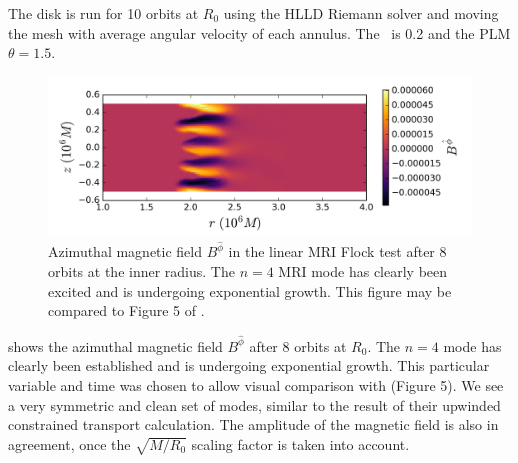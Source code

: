 The disk is run for 10 orbits at $R_0$ using the HLLD Riemann solver and moving the mesh with average angular velocity of each annulus.  The \CFL\ is 0.2 and the PLM $\theta=1.5$.

\begin{figure}
\begin{center}
	\includegraphics[width=\textwidth]{figures/numerics/flock_Bp.png}
\end{center}
\caption{Azimuthal magnetic field $B^{\hat{\phi}}$ in the linear MRI Flock test after 8 orbits at the inner radius.  The $n=4$ MRI mode has clearly been excited and is undergoing exponential growth.  This figure may be compared to Figure 5 of \citet{Flock10}. }
\end{figure}

 shows the azimuthal magnetic field $B^{\hat{\phi}}$ after 8 orbits at $R_0$.  The $n=4$ mode has clearly been established and is undergoing exponential growth.  This particular variable and time was chosen to allow visual comparison with \citet{Flock10} (Figure 5).  We see a very symmetric and clean set of modes, similar to the result of their upwinded constrained transport calculation.  The amplitude of the magnetic field is also in agreement, once the $\sqrt{M/R_0}$ scaling factor is taken into account.

